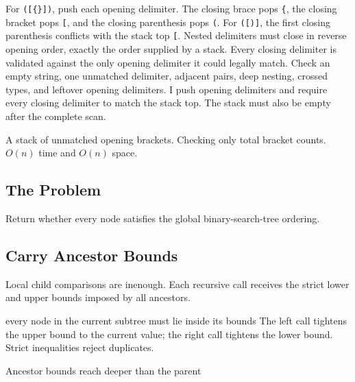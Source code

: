 \lessonexpansion
  {For \texttt{([\{\}])}, push each opening delimiter. The closing brace pops
   \texttt{\{}, the closing bracket pops \texttt{[}, and the closing
   parenthesis pops \texttt{(}. For \texttt{([)]}, the first closing
   parenthesis conflicts with the stack top \texttt{[}.}
  {Nested delimiters must close in reverse opening order, exactly the order
   supplied by a stack. Every closing delimiter is validated against the only
   opening delimiter it could legally match.}
  {Check an empty string, one unmatched delimiter, adjacent pairs, deep
   nesting, crossed types, and leftover opening delimiters.}
  {I push opening delimiters and require every closing delimiter to match the
   stack top. The stack must also be empty after the complete scan.}

  {A stack of unmatched opening brackets.}
  {Checking only total bracket counts.}{$O(n)$ time and $O(n)$ space.}



\subsection{The Problem}
Return whether every node satisfies the global binary-search-tree ordering.

\subsection{Carry Ancestor Bounds}
Local child comparisons are inenough. Each recursive call receives the
strict lower and upper bounds imposed by all ancestors.

\begin{invariantbox}{every node in the current subtree must lie inside its bounds}
The left call tightens the upper bound to the current value; the right call
tightens the lower bound. Strict inequalities reject duplicates.
\end{invariantbox}

\begin{visualbox}{Ancestor bounds reach deeper than the parent}
\centering
{}
\end{visualbox}

